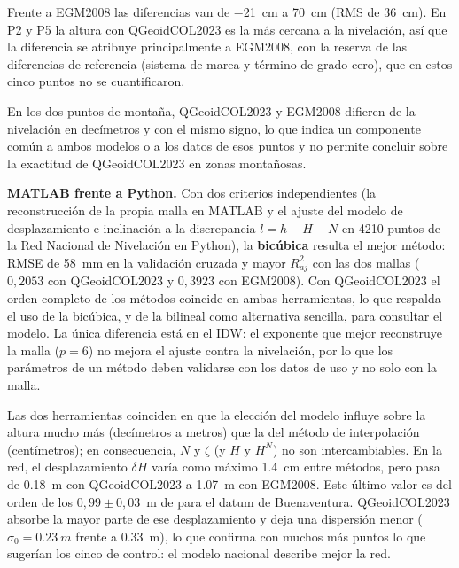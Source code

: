 \documentclass[11pt,letterpaper]{article}
\begin{document}
\vspace{0.3cm}
Frente a EGM2008 las diferencias van de \SI{-21}{cm} a \SI{+70}{cm} (RMS de \SI{36}{cm}). En
P2 y P5 la altura con QGeoidCOL2023 es la más cercana a la nivelación, así que la diferencia se
atribuye principalmente a EGM2008, con la reserva de las diferencias de referencia (sistema de
marea y término de grado cero), que en estos cinco puntos no se cuantificaron.

\vspace{0.3cm}
En los dos puntos de montaña, QGeoidCOL2023 y EGM2008 difieren de la nivelación en decímetros y
con el mismo signo, lo que indica un componente común a ambos modelos o a los datos de esos
puntos y no permite concluir sobre la exactitud de QGeoidCOL2023 en zonas montañosas.

\vspace{0.3cm}
\textbf{MATLAB frente a Python.} Con dos criterios independientes (la reconstrucción de la
propia malla en MATLAB y el ajuste del modelo de desplazamiento e inclinación a la discrepancia
$l=h-H-N$ en 4210 puntos de la Red Nacional de Nivelación en Python), la \textbf{bicúbica} resulta
el mejor método: RMSE de \SI{58}{mm} en la validación cruzada y mayor $R^2_{aj}$ con las dos mallas
($0{,}2053$ con QGeoidCOL2023 y $0{,}3923$ con EGM2008). Con QGeoidCOL2023 el orden completo de los
métodos coincide en ambas herramientas, lo que respalda el uso de la bicúbica, y de la bilineal como
alternativa sencilla, para consultar el modelo. La única diferencia está en el IDW: el exponente que
mejor reconstruye la malla ($p=6$) no mejora el ajuste contra la nivelación, por lo que los
parámetros de un método deben validarse con los datos de uso y no solo con la malla.

\vspace{0.3cm}
Las dos herramientas coinciden en que la elección del modelo influye sobre la altura mucho más
(decímetros a metros) que la del método de interpolación (centímetros); en consecuencia, $N$ y
$\zeta$ (y $H$ y $H^N$) no son intercambiables. En la red, el desplazamiento $\delta H$ varía como
máximo \SI{1.4}{cm} entre métodos, pero pasa de \SI{0.18}{m} con QGeoidCOL2023 a \SI{1.07}{m} con
EGM2008. Este último valor es del orden de los $0{,}99\pm0{,}03$~m de \citet{guimaraes2025} para el
datum de Buenaventura. QGeoidCOL2023 absorbe la mayor parte de ese desplazamiento y deja una
dispersión menor ($\hat\sigma_0=\SI{0.23}{m}$ frente a \SI{0.33}{m}), lo que confirma con muchos más
puntos lo que sugerían los cinco de control: el modelo nacional describe mejor la red.
\end{document}
